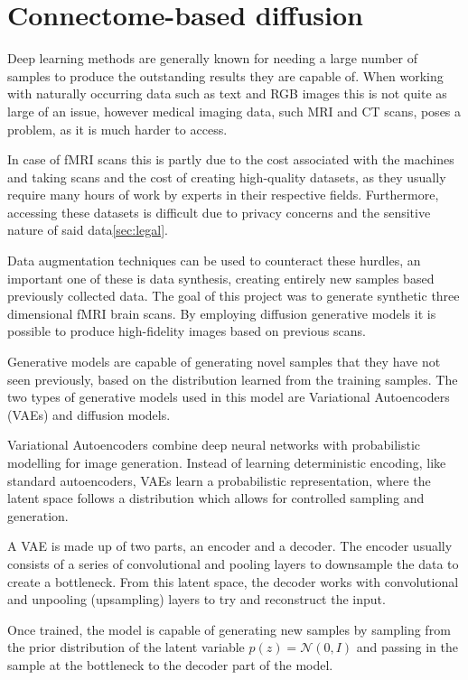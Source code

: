 \section{Connectome-based diffusion}
\label{sec:diffusion}
	
	Deep learning methods are generally known for needing a large number of samples to produce the outstanding results they are capable of\cite{alzubaidi2023survey}. When working with naturally occurring data such as text and RGB images this is not quite as large of an issue, however medical
	imaging data, such MRI and CT scans, poses a problem, as it is much harder to access.
	
	In case of fMRI scans this is partly due to the cost associated with the machines and taking scans and the cost of creating high-quality datasets, as they usually require many hours of work by experts in their respective fields. Furthermore, accessing these datasets is difficult due to privacy concerns and the sensitive nature of said data\ref{sec:legal}.

	Data augmentation techniques can be used to counteract these hurdles, an important one of these is data synthesis, creating entirely new samples based previously collected data. The goal of this project was to generate synthetic three dimensional fMRI brain scans. By employing diffusion generative models it is possible to produce high-fidelity images based on previous scans.
	
	Generative models are capable of generating novel samples that they have not seen previously, based on the distribution learned from the training samples. The two types of generative models used in this model are Variational Autoencoders (VAEs) and diffusion models.
	
	Variational Autoencoders combine deep neural networks with probabilistic modelling for image generation\cite{kingma2013auto}. Instead of learning deterministic encoding, like standard autoencoders\cite{bank2023autoencoders}, VAEs learn a probabilistic representation, where the latent space follows a distribution which allows for controlled sampling and generation.
	
	A VAE is made up of two parts, an encoder and a decoder. The encoder usually consists of a series of convolutional and pooling layers to downsample the data to create a bottleneck. From this latent space, the decoder works with convolutional and unpooling (upsampling) layers to try and reconstruct the input. 
	
	Once trained, the model is capable of generating new samples by sampling from the prior distribution of the latent variable $p(z) = \mathcal{N}(0,I)$ and passing in the sample at the bottleneck to the decoder part of the model.
	
